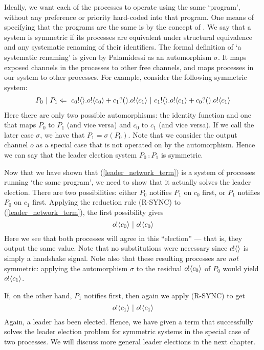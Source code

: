 Ideally, we want each of the processes to operate using the same `program', without any preference or priority hard-coded into that program.
One means of specifying that the programs are the same is by the concept of .
We say that a system is symmetric if its processes are equivalent under structural equivalence and any systematic renaming of their identifiers.
The formal definition of `a systematic renaming' is given by Palamidessi \cite{palam03} as an automorphism $\sigma$.
It maps exposed channels in the processes to other free channels, and maps processes in our system to other processes.
For example, consider the following symmetric system:
\begin{align}
	P_0\ |\  P_1 \Leftarrow\  {c_0}!\langle{}\rangle. {o}!\langle{c_0}\rangle + {c_1}?({}). {o}!\langle{c_1}\rangle \ |\  {c_1}!\langle{}\rangle. {o}!\langle{c_1}\rangle + {c_0}?({}). {o}!\langle{c_1}\rangle
	\label{leader_network_term}	
\end{align}
Here there are only two possible automorphisms: the identity function and one that maps $P_0$ to $P_1$ (and vice versa) and $c_0$ to $c_1$ (and vice versa).  
If we call the later case $\sigma$, we have that $P_1 = \sigma(P_0)$. 
Note that we consider the output channel $o$ as a special case that is not operated on by the automorphism.
Hence we can say that the leader election system $P_0 \comp P_1$ is symmetric.

Now that we have shown that (\ref{leader_network_term}) is a system of processes running `the same program', we need to show that it actually solves the leader election. 
There are two possibilities: either $P_0$ notifies $P_1$ on $c_0$ first, or $P_1$ notifies $P_0$ on $c_1$ first.  
Applying the reduction rule (R-SYNC) to (\ref{leader_network_term}), the first possibility gives
\[
	 {o}!\langle{c_0}\rangle \ |\  {o}!\langle{c_0}\rangle	
\]
Here we see that both processes will agree in this ``election'' --- that is, they output the same value.  Note that no substitutions were necessary since ${c}!\langle{}\rangle$ is simply a handshake signal.  Note also that these resulting processes are \emph{not} symmetric: applying the automorphism $\sigma$ to the residual ${o}!\langle{c_0}\rangle$ of $P_0$ would yield ${o}!\langle{c_1}\rangle$.

If, on the other hand, $P_1$ notifies first, then again we apply (R-SYNC) to get
\[
	{o}!\langle{c_1}\rangle \ |\  {o}!\langle{c_1}\rangle
\]
Again, a leader has been elected.
Hence, we have given a term that successfully solves the leader election problem for symmetric systems in the special case of two processes.  We will discuss more general leader elections in the next chapter.